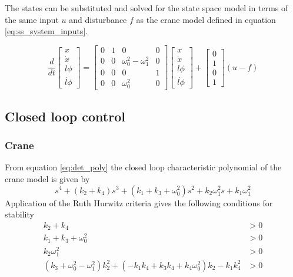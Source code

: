 \documentclass{article}
\begin{document}
The states can be substituted and solved for the state space model in terms of the same input $u$ and disturbance $f$ as the crane model defined in equation \ref{eq:ss_system_inputs}.

\begin{equation}
  \frac{d}{dt} 
  \begin{bmatrix}
     x \\ \dot{x} \\ l\phi \\ \dot{l\phi} \end{bmatrix} = \begin{bmatrix} 
      0 & 1 & 0 & 0 \\ 0 & 0 & \omega_0^2 - \omega_1^2 & 0 \\ 0 & 0 & 0 & 1 \\ 0 & 0 & \omega_0^2 & 0 \end{bmatrix} \begin{bmatrix} 
        x \\ \dot{x} \\ l\phi \\ \dot{l\phi} \end{bmatrix} + \begin{bmatrix} 
          0 \\ 1 \\ 0 \\ 1 \end{bmatrix} (u - f)
\end{equation}

\subsection{Closed loop control}


\subsubsection{Crane}

From equation \ref{eq:det_poly} the closed loop characteristic polynomial of the crane model is given by
\begin{equation}
  s^{4} + \left(k_{2} + k_{4}\right) s^{3} + \left(k_{1} + k_{3} + \omega_{0}^{2}\right) s^{2} + k_{2} \omega_{1}^{2} s + k_{1} \omega_{1}^{2}
  \label{eq:crane_poly}
\end{equation}
Application of the Ruth Hurwitz criteria gives the following conditions for stability
\begin{align}
  k_{2} + k_{4} &> 0 \\
  k_{1} + k_{3} + \omega_{0}^{2} &> 0 \\
  k_{2} \omega_{1}^{2} &> 0 \\
  \left(k_{3} + \omega_{0}^{2} - \omega_{1}^{2}\right) k_{2}^{2} + \left(- k_{1} k_{4} + k_{3} k_{4} + k_{4} \omega_{0}^{2}\right) k_{2} -  k_{1} k_{4}^{2} &> 0
\end{align}
\end{document}
